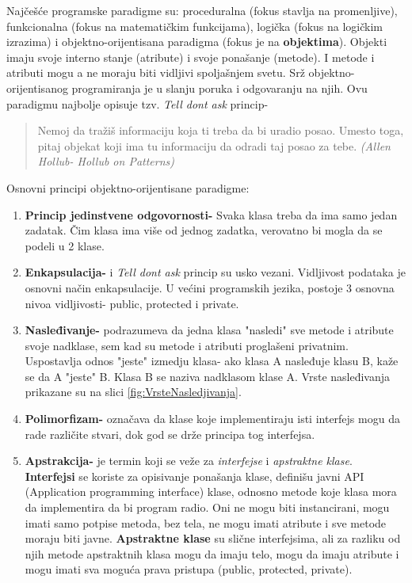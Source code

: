 \documentclass[a4paper]{article}
\begin{document}
Najčešće programske paradigme su:
proceduralna (fokus stavlja na promenljive), funkcionalna (fokus na matematičkim funkcijama), logička (fokus na logičkim izrazima) i objektno-orijentisana paradigma (fokus je na  \textbf{objektima}). Objekti imaju svoje interno stanje (atribute) i svoje ponašanje (metode).  I metode i atributi mogu a ne moraju biti vidljivi spoljašnjem svetu. Srž objektno-orijentisanog programiranja je u slanju poruka i odgovaranju na njih.  Ovu paradigmu najbolje opisuje  tzv. {\em Tell dont ask} princip- 
\begin{quotation} 
Nemoj da tražiš informaciju koja ti treba da bi uradio posao. Umesto toga, pitaj objekat koji ima tu informaciju da odradi taj posao za tebe. {\em (Allen Hollub- Hollub on Patterns)} 
\end{quotation}
Osnovni principi objektno-orijentisane paradigme:
\begin{enumerate}
\item \textbf{Princip jedinstvene odgovornosti-}  Svaka klasa treba da ima samo jedan zadatak. Čim klasa ima više od jednog zadatka, verovatno bi mogla da se podeli u 2 klase.
\item \textbf{Enkapsulacija-} i {\em Tell dont ask} princip su usko vezani. Vidljivost podataka je osnovni način enkapsulacije. U većini programskih jezika, postoje 3 osnovna nivoa vidljivosti- public, protected i private.
\item \textbf{Nasleđivanje-} podrazumeva da jedna klasa "nasledi" sve metode i atribute svoje nadklase, sem kad su metode i atributi proglašeni privatnim. Uspostavlja odnos "jeste" izmedju klasa- ako klasa A nasleđuje klasu B, kaže se da A "jeste" B. Klasa B se naziva nadklasom klase A. 
Vrste nasleđivanja prikazane su na slici \ref{fig:VrsteNasledjivanja}.
\item \textbf{Polimorfizam-} označava da klase koje implementiraju isti interfejs mogu da rade različite stvari, dok god se drže principa tog interfejsa. 
\item \textbf{Apstrakcija-} je termin koji se veže za {\em interfejse} i {\em apstraktne klase}. \textbf{Interfejsi} se koriste za opisivanje ponašanja klase, definišu javni API (Application programming interface) klase, odnosno metode koje klasa mora da implementira da bi program radio. Oni ne mogu biti instancirani, mogu imati samo potpise metoda, bez tela, ne mogu imati atribute i sve metode moraju biti javne. \textbf{Apstraktne klase} su slične interfejsima, ali za razliku od njih metode apstraktnih klasa mogu da imaju telo, mogu da imaju atribute i mogu imati sva moguća prava pristupa (public, protected, private). 
\end{enumerate}
\end{document}
